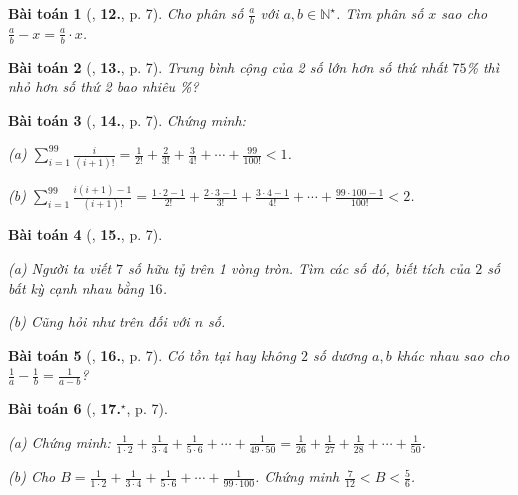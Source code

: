 \documentclass{article}
\numberwithin{equation}{section}
\newtheorem{baitoan}{Bài toán}[section]
\begin{document}
\begin{baitoan}[\cite{Binh_Toan_7_tap_1}, \textbf{12.}, p. 7]
	Cho phân số $\frac{a}{b}$ với $a,b\in\mathbb{N}^\star$. Tìm phân số $x$ sao cho $\frac{a}{b} - x = \frac{a}{b}\cdot x$.
\end{baitoan}

\begin{baitoan}[\cite{Binh_Toan_7_tap_1}, \textbf{13.}, p. 7]
	Trung bình cộng của 2 số lớn hơn số thứ nhất $75$\% thì nhỏ hơn số thứ 2 bao nhiêu \%?
\end{baitoan}

\begin{baitoan}[\cite{Binh_Toan_7_tap_1}, \textbf{14.}, p. 7]
	Chứng minh:\\	
	\begin{enumerate*}
		\item[(a)] $\sum_{i=1}^{99} \frac{i}{(i+1)!} = \frac{1}{2!} + \frac{2}{3!} + \frac{3}{4!} + \cdots + \frac{99}{100!} < 1$.
		\item[(b)] $\sum_{i=1}^{99} \frac{i(i + 1) - 1}{(i+1)!} = \frac{1\cdot 2 - 1}{2!} + \frac{2\cdot 3 - 1}{3!} + \frac{3\cdot 4 - 1}{4!} + \cdots + \frac{99\cdot 100 - 1}{100!} < 2$.
	\end{enumerate*}
\end{baitoan}

\begin{baitoan}[\cite{Binh_Toan_7_tap_1}, \textbf{15.}, p. 7]
	\begin{enumerate*}
		\item[(a)] Người ta viết $7$ số hữu tỷ trên 1 vòng tròn. Tìm các số đó, biết tích của $2$ số bất kỳ cạnh nhau bằng $16$.
		\item[(b)] Cũng hỏi như trên đối với $n$ số.
	\end{enumerate*}
\end{baitoan}

\begin{baitoan}[\cite{Binh_Toan_7_tap_1}, \textbf{16.}, p. 7]
	Có tồn tại hay không $2$ số dương $a,b$ khác nhau sao cho $\frac{1}{a} - \frac{1}{b} = \frac{1}{a - b}$?
\end{baitoan}

\begin{baitoan}[\cite{Binh_Toan_7_tap_1}, \textbf{17.}${}^\star$, p. 7]
	\begin{enumerate*}
		\item[(a)] Chứng minh: $\frac{1}{1\cdot 2} + \frac{1}{3\cdot 4} + \frac{1}{5\cdot 6} + \cdots + \frac{1}{49\cdot 50} = \frac{1}{26} + \frac{1}{27} + \frac{1}{28} + \cdots + \frac{1}{50}$.
		\item[(b)] Cho $B = \frac{1}{1\cdot 2} + \frac{1}{3\cdot 4} + \frac{1}{5\cdot 6} + \cdots + \frac{1}{99\cdot 100}$. Chứng minh $\frac{7}{12} < B < \frac{5}{6}$.
	\end{enumerate*}	
\end{baitoan}
\end{document}

